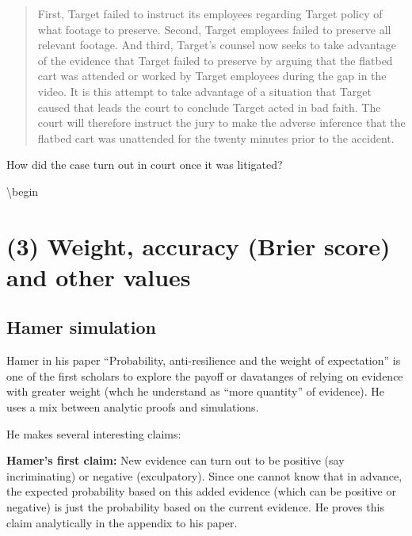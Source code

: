 \documentclass[
  10pt,
  dvipsnames,enabledeprecatedfontcommands]{scrartcl}
\begin{document}
\begin{quote}
First, Target failed to instruct its employees regarding Target policy of what footage to preserve. Second, Target employees failed to preserve all relevant footage. And third, Target’s counsel now seeks to take advantage of the evidence that Target failed to preserve by arguing that the flatbed cart was attended or worked by Target employees during the gap in the video. It is this attempt to take advantage of a situation that Target caused that leads the court to conclude Target acted in bad faith. The court will therefore instruct the jury to make the adverse inference that the flatbed cart was unattended for the twenty minutes prior to the accident.
\end{quote}

How did the case turn out in court once it was litigated?

\textbackslash begin

\hypertarget{weight-accuracy-brier-score-and-other-values}{%
\section{(3) Weight, accuracy (Brier score) and other
values}\label{weight-accuracy-brier-score-and-other-values}}

\hypertarget{hamer-simulation}{%
\subsection{Hamer simulation}\label{hamer-simulation}}

Hamer in his paper ``Probability, anti-resilience and the weight of
expectation'' is one of the first scholars to explore the payoff or
davatanges of relying on evidence with greater weight (whch he
understand as ``more quantity'' of evidence). He uses a mix between
analytic proofs and simulations.

He makes several interesting claims:

\textbf{Hamer's first claim:} New evidence can turn out to be positive
(say incriminating) or negative (exculpatory). Since one cannot know
that in advance, the expected probability based on this added evidence
(which can be positive or negative) is just the probability based on the
current evidence. He proves this claim analytically in the appendix to
his paper.

\end{document}
